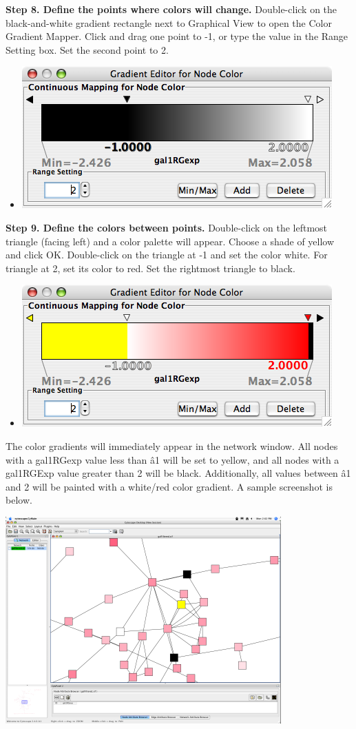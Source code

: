  \textbf{Step 8. Define the points where colors will change.}
 Double-click on the black-and-white gradient rectangle next to Graphical View to open the Color Gradient Mapper. Click and drag one point to -1, or type the value in the Range Setting box. Set the second point to 2. 
\begin{itemize}
\item 

 \includegraphics[width=.6\textwidth]{images/DefaultColorGradientEditor.png} 


\end{itemize}


 \textbf{Step 9. Define the colors between points.}
 Double-click on the leftmost triangle (facing left) and a color palette will appear. Choose a shade of yellow and click OK. Double-click on the triangle at -1 and set the color white. For triangle at 2, set its color to red. Set the rightmost triangle to black. 
\begin{itemize}
\item 

 \includegraphics[width=.6\textwidth]{images/RedYellowColorGradient2.png} 


\end{itemize}


 The color gradients will immediately appear in the network window. All nodes with a gal1RGexp value less than \^a1 will be set to yellow, and all nodes with a gal1RGExp value greater than 2 will be black. Additionally, all values between \^a1 and 2 will be painted with a white/red color gradient. A sample screenshot is below. 


 \includegraphics[width=.6\textwidth]{images/VizMapperExpRedBlack.png} 


